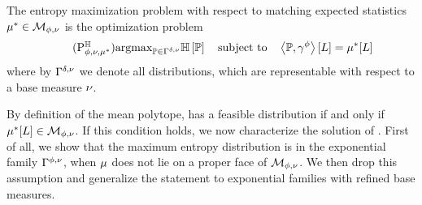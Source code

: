 \label{sec:maxEntDuality}


The entropy maximization problem with respect to matching expected statistics $\mu^*\in\mathcal{M}_{\phi,\nu}$ is the optimization problem
\begin{align}
    \tag{$\probtagtypeinst{\entropysymbol}{\sstat,\basemeasure,\genmean}$}\label{prob:maxEntropy} %
    \argmax_{\probtensor\in\bmrealprobof{\basemeasure}} \sentropyof{\probtensor} \quad \text{subject to} \quad
    \sbcontractionof{\probtensor,\sencsstat}{\selvariable} = \genmeanat{\selvariable}
\end{align}
where by $\Gamma^{\delta,\nu}$ we denote all distributions, which are representable with respect to a base measure $\nu$.

By definition of the mean polytope,  has a feasible distribution if and only if $\mu^*[L]\in\mathcal{M}_{\phi,\nu}$.
If this condition holds, we now characterize the solution of .
First of all, we show that the maximum entropy distribution is in the exponential family $\Gamma^{\phi,\nu}$, when $\mu$ does not lie on a proper face of $\mathcal{M}_{\phi,\nu}$.
We then drop this assumption and generalize the statement to exponential families with refined base measures.

